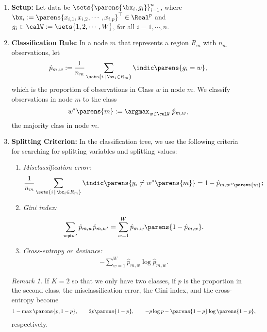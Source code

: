 \documentclass[12pt]{article}
\begin{document}
\begin{enumerate}[label=\textbf{\arabic*.}]
	
	\item \textbf{Setup:} Let data be $\sets{\parens{\bx_i, g_i}}_{i=1}^n$, where $\bx_{i} := \parens{x_{i,1}, x_{i,2}, \cdots, x_{i,p}}^\top \in \Real^p$ and $g_i \in \calW := \sets{1, 2, \cdots, W}$, for all $i = 1, \cdots, n$. 
	
	\item \textbf{Classification Rule:} In a node $m$ that represents a region $R_m$ with $n_m$ observations, let 
	\begin{align}
		\hat{p}_{m,w} := \frac{1}{n_m} \sum_{\sets{i \,\vert\, \bx_i \in R_m}} \indic \parens{g_i = w}, 
	\end{align}
	which is the proportion of observations in Class $w$ in node $m$. We classify observations in node $m$ to the class 
	\begin{align*}
		w^* \parens{m} := \argmax_{w \in \calW} \ \hat{p}_{m,w}, 
	\end{align*}
	the majority class in node $m$. 
	
	\item \textbf{Splitting Criterion:} In the classification tree, we use the following criteria for searching for splitting variables and splitting values: 
	\begin{enumerate}
		\item \textit{Misclassification error:} 
		\begin{align}
			\frac{1}{n_m} \sum_{\sets{i \,\vert\, \bx_i \in R_m}} \indic \parens{y_i \neq w^* \parens{m}} = 1 - \hat{p}_{m, w^* \parens{m}}; 
		\end{align}
		
		\item \textit{Gini index:} 
		\begin{align}
			\sum_{w \neq w'} \hat{p}_{m, w} \hat{p}_{m, w'} = \sum_{w=1}^W \hat{p}_{m,w} \parens{1 - \hat{p}_{m,w}}. 
		\end{align}
		
		\item \textit{Cross-entropy or deviance:} 
		\begin{align}
			- \sum_{w=1}^W \hat{p}_{m,w} \log \hat{p}_{m,w}. 
		\end{align}
	\end{enumerate}
	
	\textit{Remark 1.} If $K=2$ so that we only have two classes, if $p$ is the proportion in the second class, the misclassification error, the Gini index, and the cross-entropy become 
	\begin{align*}
		1 - \max \parens{p, 1-p}, \qquad 2p \parens{1-p}, \qquad - p \log p - \parens{1-p} \log \parens{1-p}, 
	\end{align*}
	respectively. 
	

\end{enumerate}
\end{document}
